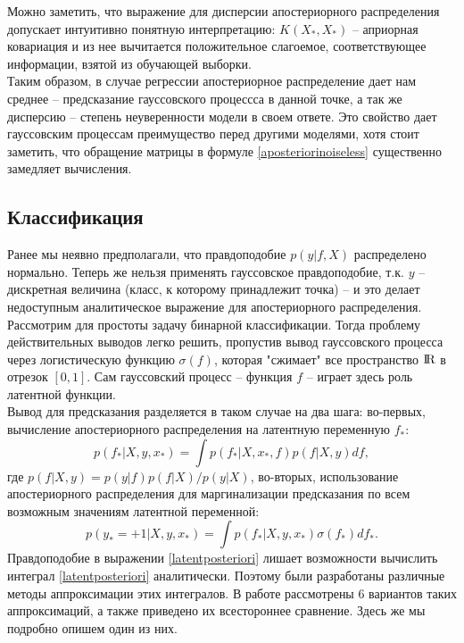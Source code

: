 \documentclass{llncs}
\begin{document}
Можно заметить, что выражение для дисперсии апостериорного распределения допускает интуитивно понятную интерпретацию: $K(X_{*}, X_{*})$ -- априорная ковариация и из нее вычитается положительное слагоемое, соответствующее информации, взятой из обучающей выборки.\\
Таким образом, в случае регрессии апостериорное распределение дает нам среднее -- предсказание гауссовского процессса в данной точке, а так же дисперсию -- степень неуверенности модели в своем ответе. Это свойство дает гауссовским процессам преимущество перед другими моделями, хотя стоит заметить, что обращение матрицы в формуле \eqref{aposteriorinoiseless} существенно замедляет вычисления.
\subsection{Классификация}
Ранее мы неявно предполагали, что правдоподобие $p(y|f, X)$ распределено нормально. Теперь же нельзя применять гауссовское правдоподобие, т.к. $y$ -- дискретная величина (класс, к которому принадлежит точка) -- и это делает недоступным аналитическое выражение для апостериорного распределения. \\
Рассмотрим для простоты задачу бинарной классификации. Тогда проблему действительных выводов легко решить, пропустив вывод гауссовского процесса через логистическую функцию $\sigma(f)$, которая "сжимает" все пространство ${\rm I\!R}$ в отрезок $\left[0, 1\right]$. Сам гауссовский процесс -- функция $f$ -- играет здесь роль латентной функции.\\
Вывод для предсказания разделяется в таком случае на два шага:
во-первых, вычисление апостериорного распределения на латентную переменную $f_{*}$:
\begin{equation}\label{latentposteriori}
p(f_{*}|X,y,x_{*}) = \int p(f_{*}|X,x_{*},f)p(f|X,y)df,
\end{equation}
где $p(f|X,y) = p(y|f)p(f|X)/p(y|X)$, во-вторых, использование апостериорного распределения для маргинализации предсказания по всем возможным значениям латентной переменной:
\begin{equation}
p(y_{*}=+1|X,y,x_{*}) = \int p(f_{*}|X,y,x_{*})\sigma(f_{*})df_*.
\end{equation}
Правдоподобие в выражении \eqref{latentposteriori} лишает возможности вычислить интеграл \eqref{latentposteriori} аналитически. Поэтому были разработаны различные методы аппроксимации этих интегралов. В работе \cite{approximations} рассмотрены 6 вариантов таких аппроксимаций, а также приведено их всестороннее сравнение. Здесь же мы подробно опишем один из них.
\end{document}
